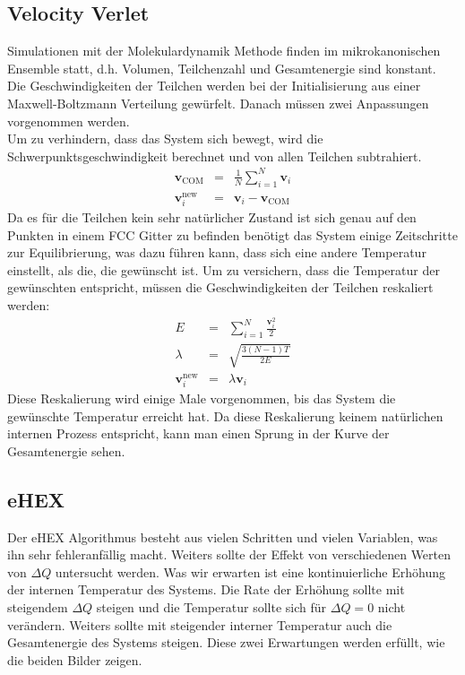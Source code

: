 \documentclass[12pt]{article}
\begin{document}
\subsection{Velocity Verlet}
Simulationen mit der Molekulardynamik Methode finden im mikrokanonischen Ensemble statt, d.h. Volumen, Teilchenzahl und Gesamtenergie sind konstant.
Die Geschwindigkeiten der Teilchen werden bei der Initialisierung aus einer Maxwell-Boltzmann Verteilung gewürfelt. Danach müssen zwei Anpassungen 
vorgenommen werden.\\
Um zu verhindern, dass das System sich bewegt, wird die Schwerpunktsgeschwindigkeit berechnet und von allen Teilchen subtrahiert.
\begin{eqnarray}
    \mathbf{v}_\text{COM} &=& \frac1N\sum_{i=1}^N \mathbf{v}_i\\
    \mathbf{v}_i^\text{new} &=& \mathbf{v}_i - \mathbf{v}_\text{COM}
\end{eqnarray}
Da es für die Teilchen kein sehr natürlicher Zustand ist sich genau auf den Punkten in einem FCC Gitter zu befinden benötigt das System 
einige Zeitschritte zur Equilibrierung, was dazu führen kann, dass sich eine andere Temperatur einstellt, als die, die gewünscht ist. Um zu 
versichern, dass die Temperatur der gewünschten entspricht, müssen die Geschwindigkeiten der Teilchen reskaliert werden:
\begin{eqnarray}
\label{eq:rescale1}   E &=& \sum_{i=1}^N \frac{\mathbf{v}_i^2}{2} \\
 \label{eq:rescale2}   \lambda &=& \sqrt{\frac{3(N-1)T}{2E}} \\
 \label{eq:rescale3}   \mathbf{v}_i^\text{new} &=& \lambda \mathbf{v}_i  
\end{eqnarray}
Diese Reskalierung wird einige Male vorgenommen, bis das System die gewünschte Temperatur erreicht hat. Da diese Reskalierung keinem 
natürlichen internen Prozess entspricht, kann man einen Sprung in der Kurve der Gesamtenergie sehen.

\subsection{eHEX}
Der eHEX Algorithmus besteht aus vielen Schritten und vielen Variablen, was ihn sehr fehleranfällig macht. Weiters sollte der Effekt von 
verschiedenen Werten von $\Delta Q$ untersucht werden. Was wir erwarten ist eine kontinuierliche Erhöhung der
internen Temperatur des Systems. Die Rate der Erhöhung sollte mit steigendem $\Delta Q$ steigen und die Temperatur sollte sich 
für $\Delta Q = 0$ nicht verändern. Weiters sollte mit steigender interner Temperatur auch die Gesamtenergie des Systems
steigen. Diese zwei Erwartungen werden erfüllt, wie die beiden Bilder zeigen.
\end{document}

